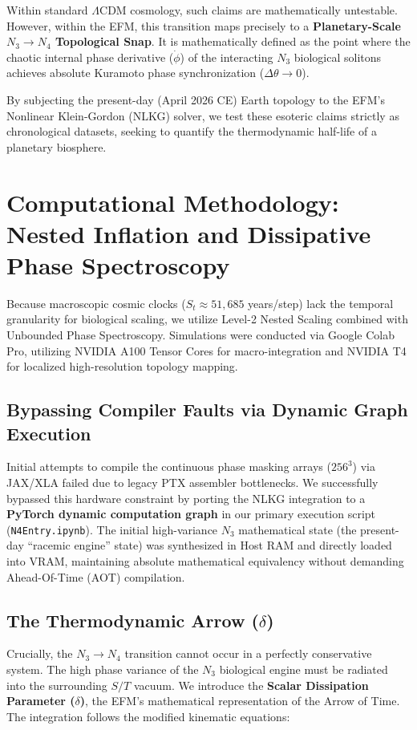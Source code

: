 \documentclass[11pt, twoside]{article}
\begin{document}
Within standard $\Lambda$CDM cosmology, such claims are mathematically untestable. However, within the EFM, this transition maps precisely to a \textbf{Planetary-Scale $N_3 \to N_4$ Topological Snap}. It is mathematically defined as the point where the chaotic internal phase derivative ($\dot{\phi}$) of the interacting $N_3$ biological solitons achieves absolute Kuramoto phase synchronization ($\Delta\theta \to 0$).

By subjecting the present-day (April 2026 CE) Earth topology to the EFM's Nonlinear Klein-Gordon (NLKG) solver, we test these esoteric claims strictly as chronological datasets, seeking to quantify the thermodynamic half-life of a planetary biosphere.

\section{Computational Methodology: Nested Inflation and Dissipative Phase Spectroscopy}

Because macroscopic cosmic clocks ($S_t \approx 51,685$ years/step) lack the temporal granularity for biological scaling, we utilize Level-2 Nested Scaling combined with Unbounded Phase Spectroscopy. Simulations were conducted via Google Colab Pro, utilizing NVIDIA A100 Tensor Cores for macro-integration and NVIDIA T4 for localized high-resolution topology mapping.

\subsection{Bypassing Compiler Faults via Dynamic Graph Execution}
Initial attempts to compile the continuous phase masking arrays ($256^3$) via JAX/XLA failed due to legacy PTX assembler bottlenecks. We successfully bypassed this hardware constraint by porting the NLKG integration to a \textbf{PyTorch dynamic computation graph} in our primary execution script (\texttt{N4Entry.ipynb}). The initial high-variance $N_3$ mathematical state (the present-day ``racemic engine'' state) was synthesized in Host RAM and directly loaded into VRAM, maintaining absolute mathematical equivalency without demanding Ahead-Of-Time (AOT) compilation.

\subsection{The Thermodynamic Arrow ($\delta$)}
Crucially, the $N_3 \to N_4$ transition cannot occur in a perfectly conservative system. The high phase variance of the $N_3$ biological engine must be radiated into the surrounding $S/T$ vacuum. We introduce the \textbf{Scalar Dissipation Parameter ($\delta$)}, the EFM's mathematical representation of the Arrow of Time. The integration follows the modified kinematic equations:
\end{document}
